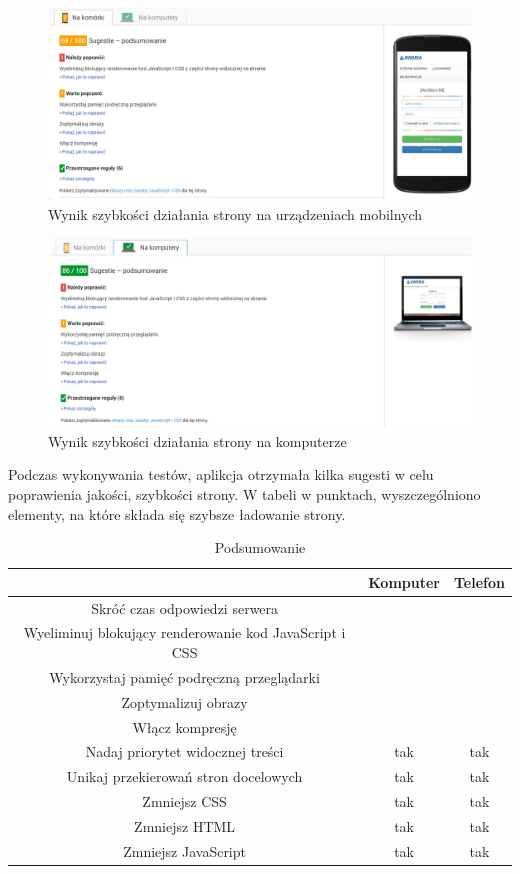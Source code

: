 \documentclass[openright]{xmgr}
\begin{document}
	\begin{figure}[!tbh]
		\centering
		\includegraphics[width=\linewidth]{image/phoneo}
		\caption{Wynik szybkości działania strony na urządzeniach mobilnych}
	\end{figure}
	
	\begin{figure}[!tbh]
		\centering
		\includegraphics[width=\linewidth]{image/computero}
		\caption{Wynik szybkości działania strony na komputerze}
	\end{figure}
	\newpage
	Podczas wykonywania testów, aplikcja otrzymała kilka sugesti w celu poprawienia jakości, szybkości strony. W tabeli w punktach, wyszczególniono elementy, na które składa się szybsze ładowanie strony.
	
	\begin{table} [!h]
		\centering
		\begin{footnotesize}
			\caption{Podsumowanie}
	\begin{tabular}{|c|c|c|}
		\hline  & Komputer  & Telefon \\ 
		\hline  Skróć czas odpowiedzi serwera &  &  \\ 
		\hline  Wyeliminuj blokujący renderowanie kod JavaScript i CSS &  &  \\ 
		\hline Wykorzystaj pamięć podręczną przeglądarki &  &  \\ 
		\hline Zoptymalizuj obrazy &  &  \\ 
		\hline Włącz kompresję &  &  \\ 
		\hline Nadaj priorytet widocznej treści & tak & tak \\ 
		\hline Unikaj przekierowań stron docelowych & tak & tak \\ 
		\hline Zmniejsz CSS & tak & tak \\ 
		\hline Zmniejsz HTML & tak & tak \\ 
		\hline Zmniejsz JavaScript & tak & tak \\ 
		\hline 
	\end{tabular}
\end{footnotesize}
\end{table}
\end{document}

